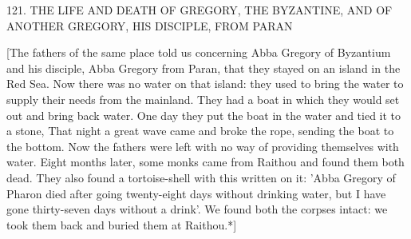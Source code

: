 121. THE LIFE AND DEATH OF GREGORY,
THE BYZANTINE, AND OF ANOTHER GREGORY,
HIS DISCIPLE, FROM PARAN

[The fathers of the same place told us concerning Abba Gregory of
Byzantium and his disciple, Abba Gregory from Paran, that they
stayed on an island in the Red Sea. Now there was no water on that
island: they used to bring the water to supply their needs from the
mainland. They had a boat in which they would set out and bring
back water. One day they put the boat in the water and tied it to a
stone, That night a great wave came and broke the rope, sending
the boat to the bottom. Now the fathers were left with no way of
providing themselves with water. Eight months later, some monks
came from Raithou and found them both dead. They also found a
tortoise-shell with this written on it: 'Abba Gregory of Pharon died
after going twenty-eight days without drinking water, but I have
gone thirty-seven days without a drink'. We found both the corpses
intact: we took them back and buried them at Raithou.*]

